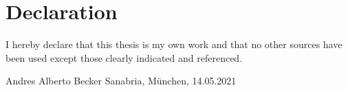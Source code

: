 \chapter*{Declaration}

\vfill

I hereby declare that this thesis is my own work and that no other sources have been used except those clearly indicated and referenced.

\vspace{3em}

\noindent Andres Alberto Becker Sanabria, München, 14.05.2021
